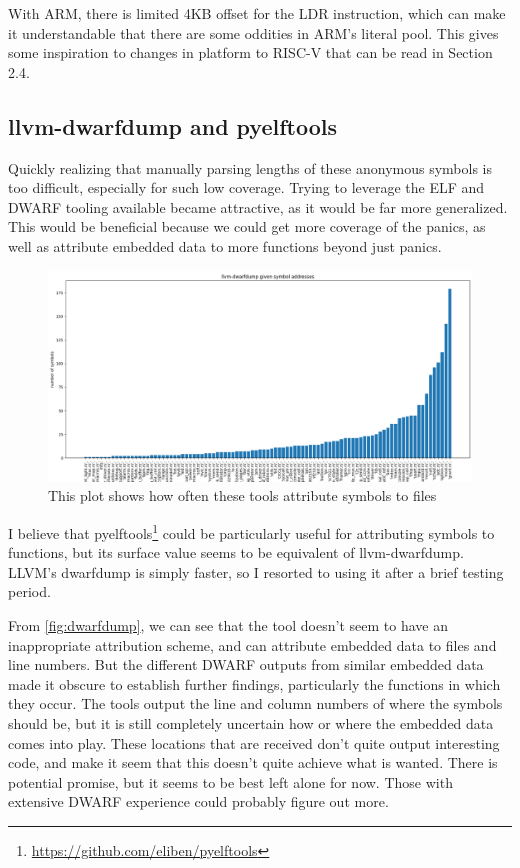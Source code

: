 \documentclass{article}
\begin{document}
With ARM, there is limited 4KB offset for the LDR instruction, which can make it understandable that there are some oddities in ARM's literal pool. This gives some inspiration to changes in platform to RISC-V that can be read in Section 2.4.

\subsection{llvm-dwarfdump and pyelftools}

Quickly realizing that manually parsing lengths of these anonymous symbols is too difficult, especially for such low coverage. Trying to leverage the ELF and DWARF tooling available became attractive, as it would be far more generalized. This would be beneficial because we could get more coverage of the panics, as well as attribute embedded data to more functions beyond just panics.

\begin{figure}[h]
\centering
\includegraphics[width=\textwidth]{dwarfdump_img.png}
\caption{\label{fig:dwarfdump}This plot shows how often these tools attribute symbols to files}
\end{figure}

I believe that pyelftools\footnote{\url{https://github.com/eliben/pyelftools}} could be particularly useful for attributing symbols to functions, but its surface value seems to be equivalent of llvm-dwarfdump. LLVM's dwarfdump is simply faster, so I resorted to using it after a brief testing period.

From \autoref{fig:dwarfdump}, we can see that the tool doesn't seem to have an inappropriate attribution scheme, and can attribute embedded data to files and line numbers. But the different DWARF outputs from similar embedded data made it obscure to establish further findings, particularly the functions in which they occur. The tools output the line and column numbers of where the symbols should be, but it is still completely uncertain how or where the embedded data comes into play. These locations that are received don't quite output interesting code, and make it seem that this doesn't quite achieve what is wanted. There is potential promise, but it seems to be best left alone for now. Those with extensive DWARF experience could probably figure out more.
\end{document}
